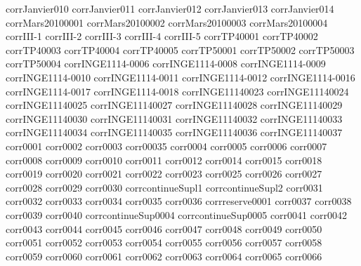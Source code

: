 {corrJanvier010}
{corrJanvier011}
{corrJanvier012}
{corrJanvier013}
{corrJanvier014}
{corrMars20100001}
{corrMars20100002}
{corrMars20100003}
{corrMars20100004}
{corrIII-1}
{corrIII-2}
{corrIII-3}
{corrIII-4}
{corrIII-5}
{corrTP40001}
{corrTP40002}
{corrTP40003}
{corrTP40004}
{corrTP40005}
{corrTP50001}
{corrTP50002}
{corrTP50003}
{corrTP50004}
{corrINGE1114-0006}
{corrINGE1114-0008}
{corrINGE1114-0009}
{corrINGE1114-0010}
{corrINGE1114-0011}
{corrINGE1114-0012}
{corrINGE1114-0016}
{corrINGE1114-0017}
{corrINGE1114-0018}
{corrINGE11140023}
{corrINGE11140024}
{corrINGE11140025}
{corrINGE11140027}
{corrINGE11140028}
{corrINGE11140029}
{corrINGE11140030}
{corrINGE11140031}
{corrINGE11140032}
{corrINGE11140033}
{corrINGE11140034}
{corrINGE11140035}
{corrINGE11140036}
{corrINGE11140037}
{corr0001}
{corr0002}
{corr0003}
{corr00035}
{corr0004}
{corr0005}
{corr0006}
{corr0007}
{corr0008}
{corr0009}
{corr0010}
{corr0011}
{corr0012}
{corr0014}
{corr0015}
{corr0018}
{corr0019}
{corr0020}
{corr0021}
{corr0022}
{corr0023}
{corr0025}
{corr0026}
{corr0027}
{corr0028}
{corr0029}
{corr0030}
{corrcontinueSupl1}
{corrcontinueSupl2}
{corr0031}
{corr0032}
{corr0033}
{corr0034}
{corr0035}
{corr0036}
{corrreserve0001}
{corr0037}
{corr0038}
{corr0039}
{corr0040}
{corrcontinueSup0004}
{corrcontinueSup0005}
{corr0041}
{corr0042}
{corr0043}
{corr0044}
{corr0045}
{corr0046}
{corr0047}
{corr0048}
{corr0049}
{corr0050}
{corr0051}
{corr0052}
{corr0053}
{corr0054}
{corr0055}
{corr0056}
{corr0057}
{corr0058}
{corr0059}
{corr0060}
{corr0061}
{corr0062}
{corr0063}
{corr0064}
{corr0065}
{corr0066}
